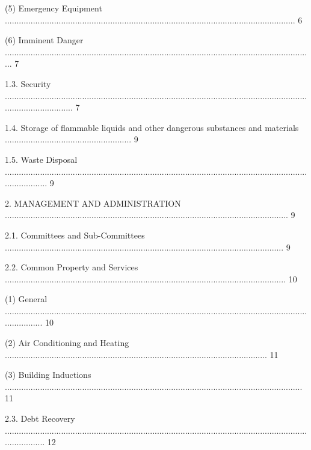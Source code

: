 \documentclass{article}
\begin{document}
{\fontsize{9.962}{1}(5) Emergency Equipment ............................................................................................................................ 6 }

{\fontsize{9.962}{1}(6) Imminent Danger .................................................................................................................................... 7 }

{\fontsize{9.99}{1}1.3. Security .............................................................................................................................................................. 7 }

{\fontsize{9.99}{1}1.4. Storage of flammable liquids and other dangerous substances and materials ...................................................... 9 }

{\fontsize{9.99}{1}1.5. Waste Disposal ................................................................................................................................................... 9 }

{\fontsize{9.99}{1}2. MANAGEMENT AND ADMINISTRATION ......................................................................................................................... 9 }

{\fontsize{9.99}{1}2.1. Committees and Sub-Committees ....................................................................................................................... 9 }

{\fontsize{9.99}{1}2.2. Common Property and Services ........................................................................................................................ 10 }

{\fontsize{9.962}{1}(1) General ................................................................................................................................................. 10 }

{\fontsize{9.962}{1}(2) Air Conditioning and Heating ................................................................................................................ 11 }

{\fontsize{9.962}{1}(3) Building Inductions ............................................................................................................................... 11 }

{\fontsize{9.99}{1}2.3. Debt Recovery .................................................................................................................................................. 12 }
\end{document}
